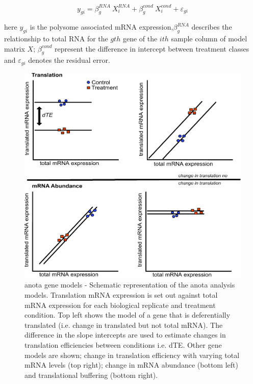 \documentclass[
  12pt,
  openany]{book}
\begin{document}
\[y_{gi} = \beta_g^{RNA}\ X_i^{RNA}+ \beta_g^{cond}\ X_i^{cond} + \varepsilon_{gi}\]

here \(y_{gi}\) is the polysome associated mRNA expression,\(\beta_g^{RNA}\) describes the relationship to total RNA for the \(gth\) gene of the \(ith\) sample column of model matrix \(X\); \(\beta_g^{cond}\) represent the difference in intercept between treatment classes and \(\varepsilon_{gi}\) denotes the residual error.

\begin{figure}
  \includegraphics{./figures/geneModes_anota_Larsson.pdf}
  \caption{anota gene models - Schematic representation of the anota analysis models. Translation mRNA expression is set out against total mRNA expression for each biological replicate and treatment condition. Top left shows the model of a gene that is deferentially translated (i.e. change in translated but not total mRNA). The difference in the slope intercepts are used to estimate changes in translation efficiencies between conditions i.e. dTE. Other gene models are shown; change in translation efficiency with varying total mRNA levels (top right); change in mRNA abundance (bottom left) and translational buffering (bottom right).
  \label{fig:anota}}
\end{figure}
\end{document}
